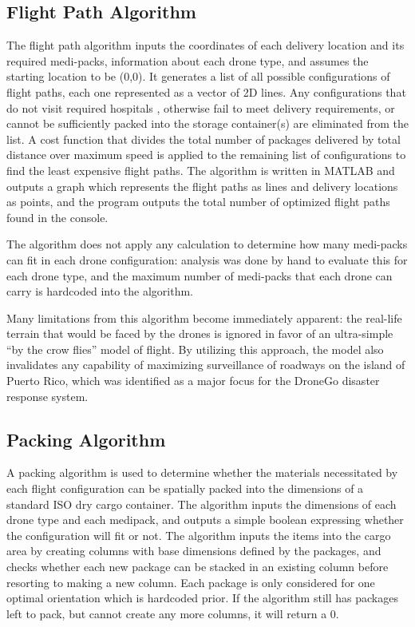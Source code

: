 \documentclass[twocolumn,10pt]{asme2ej}
\begin{document}
\subsection{Flight Path Algorithm}
The flight path algorithm inputs the coordinates of each delivery location and its required medi-packs, information about each drone type, and assumes the starting location to be (0,0). It generates a list of all possible configurations of flight paths, each one represented as a vector of 2D lines. Any configurations that do not visit required hospitals , otherwise fail to meet delivery requirements, or cannot be sufficiently packed into the storage container(s) are eliminated from the list. A cost function that divides the total number of packages delivered by total distance over maximum speed is applied to the remaining list of configurations to find the least expensive flight paths. The algorithm is written in MATLAB and outputs a graph which represents the flight paths as lines and delivery locations as points, and the program outputs the total number of optimized flight paths found in the console.

The algorithm does not apply any calculation to determine how many medi-packs can fit in each drone configuration: analysis was done by hand to evaluate this for each drone type, and the maximum number of medi-packs that each drone can carry is hardcoded into the algorithm. 

Many limitations from this algorithm become immediately apparent: the real-life terrain that would be faced by the drones is ignored in favor of an ultra-simple “by the crow flies” model of flight. By utilizing this approach, the model also invalidates any capability of maximizing surveillance of roadways on the island of Puerto Rico, which was identified as a major focus for the DroneGo disaster response system.

\subsection{Packing Algorithm}
A packing algorithm is used to determine whether the materials necessitated by each flight configuration can be spatially packed into the dimensions of a standard ISO dry cargo container. The algorithm inputs the dimensions of each drone type and each medipack, and outputs a simple boolean expressing whether the configuration will fit or not. The algorithm  inputs the items into the cargo area by creating columns with base dimensions defined by the packages, and checks whether each new package can be stacked in an existing column before resorting to making a new column. Each package is only considered for one optimal orientation which is hardcoded prior. If the algorithm still has packages left to pack, but cannot create any more columns, it will return a 0.
\end{document}
